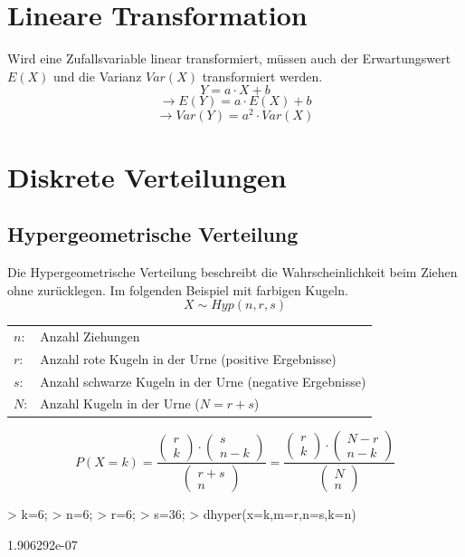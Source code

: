 \newpage
\section{Lineare Transformation}
Wird eine Zufallsvariable linear transformiert, müssen auch der Erwartungswert 
$E(X)$ und die Varianz $Var(X)$ transformiert werden. 
\[ Y = a \cdot X + b \]
\[ \rightarrow E(Y) = a \cdot E(X) + b \]
\[ \rightarrow Var(Y) = a^2 \cdot Var(X) \]

\section{Diskrete Verteilungen}

\subsection{Hypergeometrische Verteilung}
Die Hypergeometrische Verteilung beschreibt die Wahrscheinlichkeit beim 
Ziehen ohne zurücklegen. Im folgenden Beispiel mit farbigen Kugeln. 
\[ X \sim Hyp(n, r, s) \]
\begin{tabular}{@{}ll}
  $n$: & Anzahl Ziehungen \\
  $r$: & Anzahl rote Kugeln in der Urne (positive Ergebnisse) \\
  $s$: & Anzahl schwarze Kugeln in der Urne (negative Ergebnisse) \\
  $N$: & Anzahl Kugeln in der Urne ($N = r + s$)
\end{tabular}
\[ P(X=k) 
= \frac{\left( \begin{array}{c}r\\k\end{array} \right) \cdot 
\left( \begin{array}{c}s\\n-k\end{array} \right)}
{\left( \begin{array}{c}r+s\\n\end{array} \right)} 
= \frac{\left( \begin{array}{c}r\\k\end{array} \right) \cdot 
\left( \begin{array}{c}N-r\\n-k\end{array} \right)}
{\left( \begin{array}{c}N\\n\end{array} \right)} \]
\begin{Schunk}
\begin{Sinput}
> k=6;
> n=6;
> r=6;
> s=36;
> dhyper(x=k,m=r,n=s,k=n)
\end{Sinput}
\begin{Soutput}
[1] 1.906292e-07
\end{Soutput}
\end{Schunk}

